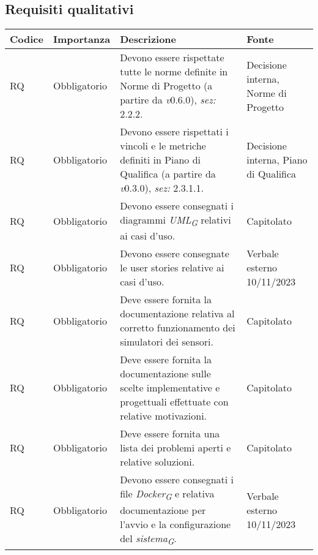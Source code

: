 \subsection{Requisiti qualitativi}
\setcounter{rowcounter}{0}
\begin{longtable}{|C{1.5cm}|C{2cm}|L{5cm}|C{2cm}|}
    \hline
    \textbf{Codice} & \textbf{Importanza} & \textbf{Descrizione} & \textbf{Fonte} \\

    \hline
     RQ & Obbligatorio & Devono essere rispettate tutte le norme definite in Norme di Progetto (a partire da \textit{v}0.6.0), \textit{sez:} 2.2.2. & Decisione interna, Norme di Progetto \\

    \hline
     RQ & Obbligatorio & Devono essere rispettati i vincoli e le metriche definiti in Piano di Qualifica (a partire da \textit{v}0.3.0), \textit{sez:} 2.3.1.1. & Decisione interna, Piano di Qualifica \\

    \hline
     RQ & Obbligatorio & Devono essere consegnati i diagrammi \textit{UML}\textsubscript{\textit{G}} relativi ai casi d'uso. & Capitolato\\

    \hline
     RQ & Obbligatorio & Devono essere consegnate le user stories relative ai casi d'uso. & Verbale esterno 10/11/2023\\

    \hline
     RQ & Obbligatorio & Deve essere fornita la documentazione relativa al corretto funzionamento dei simulatori dei sensori. & Capitolato\\

    \hline
     RQ & Obbligatorio & Deve essere fornita la documentazione sulle scelte implementative e progettuali effettuate con relative motivazioni. & Capitolato \\

    \hline
     RQ & Obbligatorio & Deve essere fornita una lista dei problemi aperti e relative soluzioni. & Capitolato \\

    \hline
     RQ & Obbligatorio & Devono essere consegnati i file \textit{Docker}\textsubscript{\textit{G}} e relativa documentazione per l'avvio e la configurazione del \textit{sistema}\textsubscript{\textit{G}}. & Verbale esterno 10/11/2023 \\


\end{longtable}
